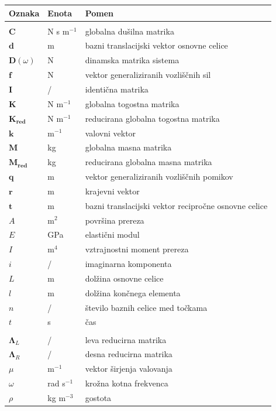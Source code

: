 \documentclass[12pt]{report}
\begin{document}
\begin{longtable}[l]{@{}p{}@{}p{}@{}p{}@{}}
\hline
Oznaka & Enota & Pomen\\
\hline
\endfirsthead
\hline
\endhead
&&\\
$\mathbf{C}$ & N s m$^{-1}$ & globalna dušilna matrika\\
$\mathbf{d}$ & m & bazni translacijski vektor osnovne celice \\
$\mathbf{D}(\omega)$ & N & dinamska matrika sistema \\
$\mathbf{f}$ & N & vektor generaliziranih vozliščnih sil \\
$\mathbf{I}$ & / & identična matrika\\
$\mathbf{K}$ & N m$^{-1}$ & globalna togostna matrika \\
$\mathbf{K_{red}}$ & N m$^{-1}$ & reducirana globalna togostna matrika \\
$\mathbf{k}$ & m$^{-1}$ & valovni vektor \\
$\mathbf{M}$ & kg & globalna masna matrika\\
$\mathbf{M_{red}}$ & kg & reducirana globalna masna matrika\\
$\mathbf{q}$ & m & vektor generaliziranih vozliščnih pomikov \\
$\mathbf{r}$ & m & krajevni vektor \\
$\mathbf{t}$ & m & bazni translacijski vektor recipročne osnovne celice \\
$A$ & m$^2$ & površina prereza \\
$E$ & GPa & elastični modul \\
$I$ & m$^4$ & vztrajnostni moment prereza \\
$i$ & / & imaginarna komponenta \\
$L$ & m & dolžina osnovne celice \\
$l$ & m & dolžina končnega elementa \\
$n$ & / & število baznih celice med točkama \\
$t$ & s & čas \\
&&\\
$\mathbf{\Lambda}_L$ & / & leva reducirna matrika\\
$\mathbf{\Lambda}_R$ & / & desna reducirna matrika\\
$\mu$ & m$^{-1}$ & vektor širjenja valovanja\\
$\omega$ & rad s$^{-1}$ & krožna kotna frekvenca\\
$\rho$ & kg m$^{-3}$ & gostota\\
\end{longtable}
\end{document}
